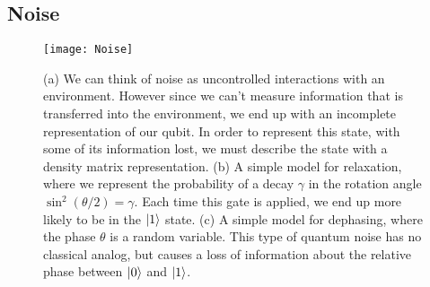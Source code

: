 \subsection{Noise}
\label{sec:noise}
\begin{figure}
  \texttt{[image: Noise]}
  \caption[Noise affecting pure states]
  {(a) We can think of noise as uncontrolled interactions with an environment. However since we can't measure
  information that is transferred into the environment, we end up with an incomplete representation of our qubit.
  In order to represent this state, with some of its information lost, we must describe the state with a density
  matrix representation. (b) A simple model for relaxation, where we represent the probability of a decay $\gamma$
  in the rotation angle $\sin^2(\theta/2) = \gamma$. Each time this gate is applied, we end up more likely to be in
  the $\ket{1}$ state. (c) A simple model for dephasing, where the phase $\theta$ is a random variable. This type
  of quantum noise has no classical analog, but causes a loss of information about the relative phase between $\ket{0}$
  and $\ket{1}$.}
  \label{fig:noise}
\end{figure}

